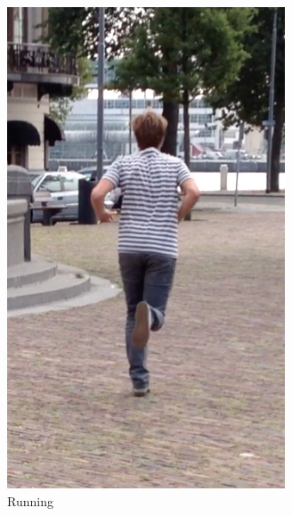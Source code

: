 \begin{figure}
\begin{subfigure}[b]{0.2\textwidth}
    \includegraphics[width=\textwidth]{./Figures/chapter6/data_collection/stills/jos_run_2.png}
    \caption{Running}
    \label{fig:stills_subject_2_running}
  \end{subfigure}
  \par\bigskip
  \begin{subfigure}[b]{0.2\textwidth}

\end{subfigure}
\end{figure}
